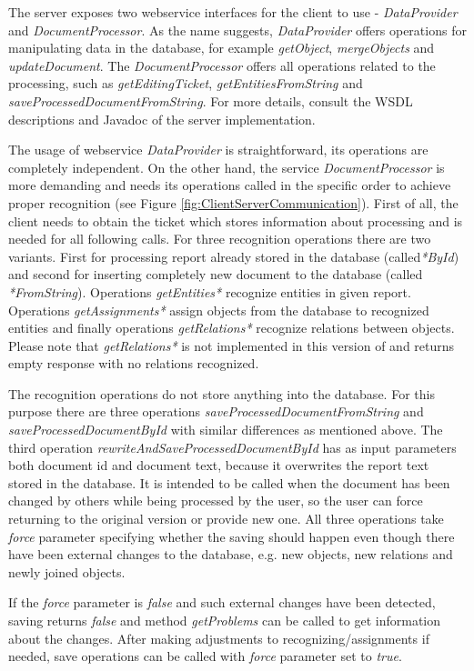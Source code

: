 The \textan{} server exposes two webservice interfaces for the client to use -
\emph{DataProvider} and \emph{DocumentProcessor}. As the name suggests,
\emph{DataProvider} offers operations for manipulating data in the database,
for example \emph{getObject}, \emph{mergeObjects} and \emph{updateDocument}.
The \emph{DocumentProcessor} offers all operations related to the processing,
such as \emph{getEditingTicket}, \emph{getEntitiesFromString} and
\emph{saveProcessedDocumentFromString}.
For more details, consult the WSDL descriptions and Javadoc of the server
implementation.

The usage of webservice \emph{DataProvider} is straightforward, its operations
are completely independent. On the other hand, the service
\emph{DocumentProcessor} is more demanding and needs its operations
called in the specific order to achieve proper recognition (see Figure
\ref{fig:ClientServerCommunication}). First of all, the client needs to obtain
the ticket which stores information about processing and is needed for all
following calls. For three recognition operations there are two variants. First
for processing report already stored in the database (called\emph{*ById}) and
second for inserting completely new document to the database (called
\emph{*FromString}). Operations \emph{getEntities*} recognize entities in
given report. Operations \emph{getAssignments*} assign objects from the database
to recognized entities and finally operations \emph{getRelations*} recognize
relations between objects. Please note that \emph{getRelations*} is not
implemented in this version of \textan{} and returns empty response with no
relations recognized.

The recognition operations do not store anything into the database. For this
purpose there are three operations \emph{saveProcessedDocumentFromString} and
\emph{saveProcessedDocumentById} with similar differences as mentioned above.
The third operation \emph{rewriteAndSaveProcessedDocumentById} has as input
parameters both document id and document text, because it overwrites the report
text stored in the database. It is intended to be called when the document has
been changed by others while being processed by the user, so the user can
force returning to the original version or provide new one. All three operations
take \emph{force} parameter specifying whether the saving should happen even
though there have been external changes to the database, e.g. new objects, new
relations and newly joined objects.

If the \emph{force} parameter is \emph{false} and such external changes have
been detected, saving returns \emph{false} and method \emph{getProblems} can be
called to get information about the changes. After making adjustments to
recognizing/assignments if needed, save operations can be called with
\emph{force} parameter set to \emph{true}.

